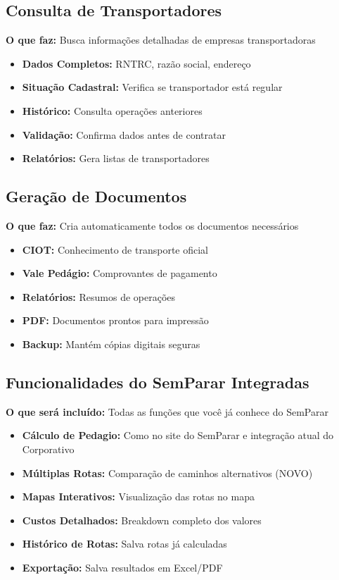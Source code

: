 \documentclass[12pt,a4paper]{article}
\begin{document}
\subsection{Consulta de Transportadores}
\textbf{O que faz:} Busca informações detalhadas de empresas transportadoras
\begin{itemize}
    \item \textbf{Dados Completos:} RNTRC, razão social, endereço
    \item \textbf{Situação Cadastral:} Verifica se transportador está regular
    \item \textbf{Histórico:} Consulta operações anteriores
    \item \textbf{Validação:} Confirma dados antes de contratar
    \item \textbf{Relatórios:} Gera listas de transportadores
\end{itemize}

\subsection{Geração de Documentos}
\textbf{O que faz:} Cria automaticamente todos os documentos necessários
\begin{itemize}
    \item \textbf{CIOT:} Conhecimento de transporte oficial
    \item \textbf{Vale Pedágio:} Comprovantes de pagamento
    \item \textbf{Relatórios:} Resumos de operações
    \item \textbf{PDF:} Documentos prontos para impressão
    \item \textbf{Backup:} Mantém cópias digitais seguras
\end{itemize}

\subsection{Funcionalidades do SemParar Integradas}
\textbf{O que será incluído:} Todas as funções que você já conhece do SemParar
\begin{itemize}
    \item \textbf{Cálculo de Pedagio:} Como no site do SemParar e integração atual do Corporativo
    \item \textbf{Múltiplas Rotas:} Comparação de caminhos alternativos (NOVO)
    \item \textbf{Mapas Interativos:} Visualização das rotas no mapa
    \item \textbf{Custos Detalhados:} Breakdown completo dos valores
    \item \textbf{Histórico de Rotas:} Salva rotas já calculadas
    \item \textbf{Exportação:} Salva resultados em Excel/PDF
\end{itemize}
\end{document}
